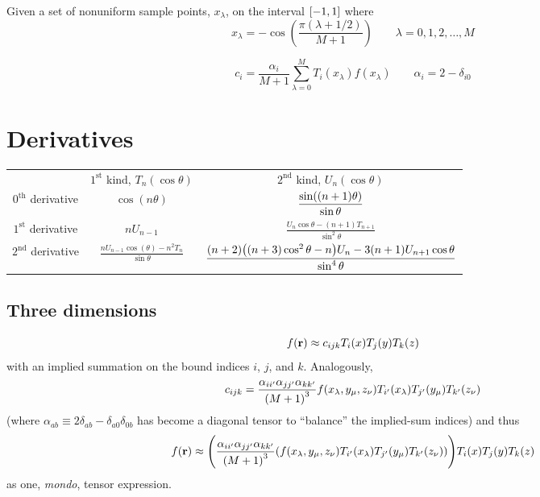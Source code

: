 Given a set of nonuniform sample points, $x_\lambda$, on the interval $\qty[-1, 1]$ where
\begin{equation}
  x_\lambda = -\cos(\frac{\pi (\lambda + 1/2)}{M + 1}) \qquad \lambda = 0, 1, 2, \ldots, M
\end{equation}

\begin{equation}
  c_i = \frac{\alpha_{i}}{M + 1}\sum_{\lambda = 0}^M T_{i}(x_\lambda) f(x_\lambda) \qquad \alpha_i = 2 - \delta_{i0}
\end{equation}

\section{Derivatives}

\begin{center}
\begin{tabular}{ccc}
                          & $1^\text{st}$ kind, $T_n(\cos\theta)$                                & $2^\text{nd}$ kind, $U_n(\cos\theta)$\\
$0^\text{th}$ derivative  & $\displaystyle \cos(n \theta)$                                       & $\displaystyle \frac{\sin(\qty(n + 1)\theta)}{\sin\theta}$ \\[0.3cm]
$1^\text{st}$ derivative  & $\displaystyle n U_{n-1}$                                            & $\displaystyle \frac{U_n \cos\theta - (n+1)T_{n+1}}{\sin^2\theta}$ \\[0.3cm]
$2^\text{nd}$ derivative  & $\displaystyle \frac{n U_{n-1}\cos(\theta) - n^2 T_{n}}{\sin\theta}$ & $\displaystyle \frac{(n+2)\qty((n+3)\cos^2\theta - n)U_n - 3(n+1)U_{n+1}\cos\theta }{\sin^4\theta}$
\end{tabular}
\end{center}

\subsection{Three dimensions}
\begin{equation}
  f(\vb{r}) \approx c_{ijk}T_i(x) T_j(y) T_k(z)
\end{equation}
with an implied summation on the bound indices $i$, $j$, and $k$.
Analogously,
\begin{equation}
  c_{ijk} = \frac{\alpha_{ii'} \alpha_{jj'} \alpha_{kk'}}{\qty(M+1)^3} f(x_\lambda, y_\mu, z_\nu) T_{i'}(x_\lambda) T_{j'}(y_\mu) T_{k'}(z_\nu)
\end{equation}
(where $\alpha_{ab} \equiv 2\delta_{ab} - \delta_{a0}\delta_{0b}$ has become a diagonal tensor to ``balance'' the implied-sum indices) and thus
\begin{equation}
  f(\vb{r}) \approx \qty(\frac{\alpha_{ii'} \alpha_{jj'} \alpha_{kk'}}{\qty(M+1)^3} \qty(f(x_\lambda, y_\mu, z_\nu) T_{i'}(x_\lambda) T_{j'}(y_\mu) T_{k'}(z_\nu))) T_i(x) T_j(y) T_k(z)
\end{equation}
as one, \emph{mondo}, tensor expression.
